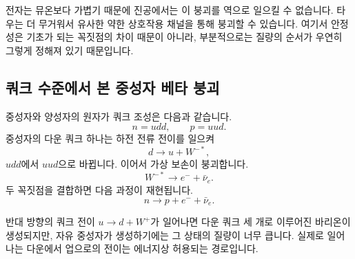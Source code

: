 전자는 뮤온보다 가볍기 때문에 진공에서는 이 붕괴를 역으로 일으킬 수 없습니다. 타우는 더 무거워서 유사한 약한 상호작용 채널을 통해 붕괴할 수 있습니다. 여기서 안정성은 기초가 되는 꼭짓점의 차이 때문이 아니라, 부분적으로는 질량의 순서가 우연히 그렇게 정해져 있기 때문입니다.

\begin{classroomqa}
\end{classroomqa}

\subsection{쿼크 수준에서 본 중성자 베타 붕괴}

중성자와 양성자의 원자가 쿼크 조성은 다음과 같습니다.
\begin{equation}
n=udd,
\qquad
p=uud.
\end{equation}
중성자의 다운 쿼크 하나는 하전 전류 전이를 일으켜
\begin{equation}
d\longrightarrow u+W^{-*},
\end{equation}
\(udd\)에서 \(uud\)으로 바뀝니다. 이어서 가상 보손이 붕괴합니다.
\begin{equation}
W^{-*}\longrightarrow e^-+\bar\nu_e.
\end{equation}
두 꼭짓점을 결합하면 다음 과정이 재현됩니다.
\begin{equation}
n\longrightarrow p+e^-+\bar\nu_e.
\end{equation}

반대 방향의 쿼크 전이 \(u\to d+W^+\)가 일어나면 다운 쿼크 세 개로 이루어진 바리온이 생성되지만, 자유 중성자가 생성하기에는 그 상태의 질량이 너무 큽니다. 실제로 일어나는 다운에서 업으로의 전이는 에너지상 허용되는 경로입니다.

\begin{classroomqa}
\end{classroomqa}

